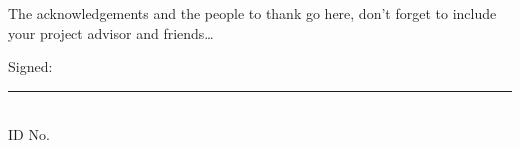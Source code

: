 \documentclass[11pt, a4paper, oneside]{Thesis} %
\title{\ttitle} %
\begin{document}
\frontmatter %


\fancyhead{} %
\rhead{\thepage} %
\lhead{} %

\pagestyle{fancy} %


\maketitle
\Declaration

\Certificate


\begin{abstract}
The Thesis Abstract is written here (and usually kept to just this page).
The page is kept centered vertically so it can expand into the blank space above
the title too\ldots

\end{abstract}

\begin{acknowledgements}

The acknowledgements and the people to thank go here, don't forget to include your project advisor and friends\ldots

\vspace{2cm}
Signed:\\
\rule[1em]{25em}{0.5pt} %

\authornames\\
ID No. \idnum\\
\end{acknowledgements}

\end{document}
